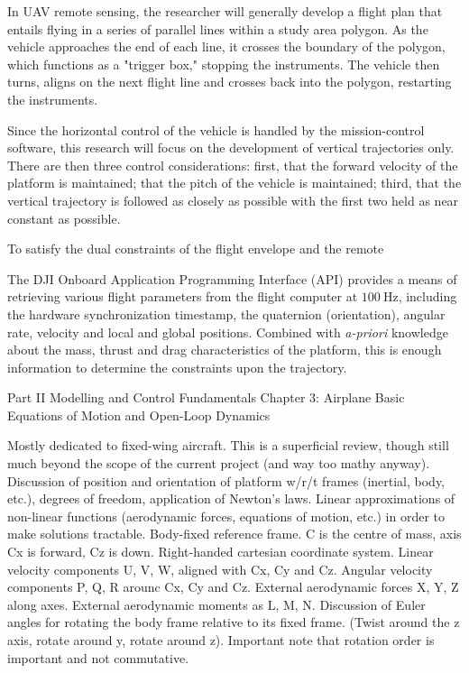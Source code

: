 In UAV remote sensing, the researcher will generally develop a flight plan that entails flying in a series of parallel lines within a study area polygon. As the vehicle approaches the end of each line, it crosses the boundary of the polygon, which functions as a "trigger box," stopping the instruments. The vehicle then turns, aligns on the next flight line and crosses back into the polygon, restarting the instruments. 

Since the horizontal control of the vehicle is handled by the mission-control software, this research will focus on the development of vertical trajectories only. There are then three control considerations: first, that the forward velocity of the platform is maintained; that the pitch of the vehicle is maintained; third, that the vertical trajectory is followed as closely as possible with the first two held as near constant as possible.

To satisfy the dual constraints of the flight envelope and the remote




The DJI Onboard Application Programming Interface (API) \cite{DJI2018} provides a means of retrieving various flight parameters from the flight computer at $\SI{100}\Hz$, including the hardware synchronization timestamp, the quaternion (orientation), angular rate, velocity and local and global positions. Combined with \emph{a-priori} knowledge about the mass, thrust and drag characteristics of the platform, this is enough information to determine the constraints upon the trajectory.





Part II Modelling and Control Fundamentals
Chapter 3: Airplane Basic Equations of Motion and Open-Loop Dynamics

Mostly dedicated to fixed-wing aircraft.
This is a superficial review, though still much beyond the scope of the current project (and way too mathy anyway).
Discussion of position and orientation of platform w/r/t frames (inertial, body, etc.), degrees of freedom, application of Newton’s laws.
Linear approximations of non-linear functions (aerodynamic forces, equations of motion, etc.) in order to make solutions tractable.
Body-fixed reference frame. C is the centre of mass, axis Cx is forward, Cz is down. Right-handed cartesian coordinate system.
Linear velocity components U, V, W, aligned with Cx, Cy and Cz.
Angular velocity components P, Q, R arounc Cx, Cy and Cz.
External aerodynamic forces X, Y, Z along axes. External aerodynamic moments as L, M, N.
Discussion of Euler angles for rotating the body frame relative to its fixed frame. (Twist around the z axis, rotate around y, rotate around z).
Important note that rotation order is important and not commutative.


